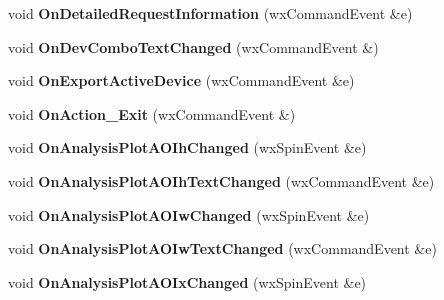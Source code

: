\begin{DoxyCompactItemize}
\item 
\hypertarget{class_prop_view_frame_a694a8aa5bcc854c7e8d169ee7d647487}{void {\bfseries On\+Detailed\+Request\+Information} (wx\+Command\+Event \&e)}\label{class_prop_view_frame_a694a8aa5bcc854c7e8d169ee7d647487}

\item 
\hypertarget{class_prop_view_frame_ad38fe3c73d14c145ec8aea4c7b8f64e1}{void {\bfseries On\+Dev\+Combo\+Text\+Changed} (wx\+Command\+Event \&)}\label{class_prop_view_frame_ad38fe3c73d14c145ec8aea4c7b8f64e1}

\item 
\hypertarget{class_prop_view_frame_aacab2e0bae80815ea7ee613ee8133900}{void {\bfseries On\+Export\+Active\+Device} (wx\+Command\+Event \&e)}\label{class_prop_view_frame_aacab2e0bae80815ea7ee613ee8133900}

\item 
\hypertarget{class_prop_view_frame_adeed059f1152e718929e6909d92ec796}{void {\bfseries On\+Action\+\_\+\+Exit} (wx\+Command\+Event \&)}\label{class_prop_view_frame_adeed059f1152e718929e6909d92ec796}

\item 
\hypertarget{class_prop_view_frame_ab6cda23dc01781d2c9bf01bdd2138b8b}{void {\bfseries On\+Analysis\+Plot\+A\+O\+Ih\+Changed} (wx\+Spin\+Event \&e)}\label{class_prop_view_frame_ab6cda23dc01781d2c9bf01bdd2138b8b}

\item 
\hypertarget{class_prop_view_frame_a483352287d1e5c14c8354dca3c9e7dcb}{void {\bfseries On\+Analysis\+Plot\+A\+O\+Ih\+Text\+Changed} (wx\+Command\+Event \&e)}\label{class_prop_view_frame_a483352287d1e5c14c8354dca3c9e7dcb}

\item 
\hypertarget{class_prop_view_frame_a04309952bcd07c559a9e009c04ab5a7a}{void {\bfseries On\+Analysis\+Plot\+A\+O\+Iw\+Changed} (wx\+Spin\+Event \&e)}\label{class_prop_view_frame_a04309952bcd07c559a9e009c04ab5a7a}

\item 
\hypertarget{class_prop_view_frame_a441fbb051ae7a817d341a8b950fd8f53}{void {\bfseries On\+Analysis\+Plot\+A\+O\+Iw\+Text\+Changed} (wx\+Command\+Event \&e)}\label{class_prop_view_frame_a441fbb051ae7a817d341a8b950fd8f53}

\item 
\hypertarget{class_prop_view_frame_a1108d6b0d3ac04d41fcb9f942e009456}{void {\bfseries On\+Analysis\+Plot\+A\+O\+Ix\+Changed} (wx\+Spin\+Event \&e)}\label{class_prop_view_frame_a1108d6b0d3ac04d41fcb9f942e009456}


\end{DoxyCompactItemize}
